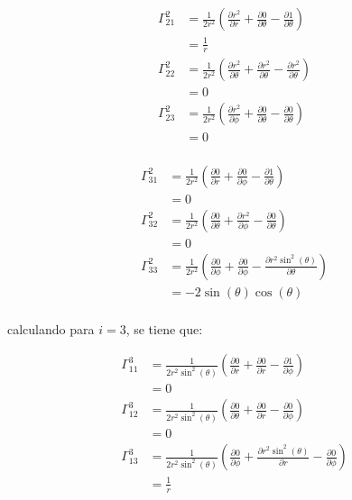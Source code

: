 \documentclass[12pt,letterpaper]{report}
\begin{document}
\hspace{0.25cm}
\begin{minipage}{0.3\linewidth}
    \begin{align*}
        \Gamma^{2}_{21} &= \frac{1}{2r^2} \left(\frac{\partial r^2}{\partial r}+ \frac{\partial 0}{\partial \theta} - \frac{\partial 1}{\partial \theta}\right)\\
&=\frac{1}{r}\\
\Gamma^{2}_{22} &= \frac{1}{2r^2} \left(\frac{\partial r^2}{\partial \theta}+\frac{\partial r^2}{\partial \theta}-\frac{\partial r^2}{\partial \theta} \right)\\
&=0\\
\Gamma^{2}_{23} &= \frac{1}{2r^2} \left(\frac{\partial r^2}{\partial \phi}+\frac{\partial 0}{\partial \theta}-\frac{\partial 0}{\partial \theta} \right)\\
&=0\\
    \end{align*}
\end{minipage}
\hspace{0.25cm}
\begin{minipage}{0.3\linewidth}
    \begin{align*}
        \Gamma^{2}_{31} &= \frac{1}{2r^2} \left(\frac{\partial 0}{\partial r}+ \frac{\partial 0}{\partial \phi} - \frac{\partial 1}{\partial \theta}\right)\\
        &=0\\
        \Gamma^{2}_{32} &= \frac{1}{2r^2} \left(\frac{\partial 0}{\partial \theta}+\frac{\partial r^2}{\partial \phi}-\frac{\partial 0}{\partial \theta} \right)\\
        &=0\\
        \Gamma^{2}_{33} &= \frac{1}{2r^2} \left(\frac{\partial 0}{\partial \phi}+\frac{\partial 0}{\partial \phi}-\frac{\partial r^2\sin^2(\theta)}{\partial \theta} \right)\\
        &=-2\sin(\theta)\cos(\theta)\\  
    \end{align*}
\end{minipage}
calculando para $i=3$, se tiene que:\\
\begin{minipage}{0.3\linewidth}
    \begin{align*}
        \Gamma^{3}_{11} &= \frac{1}{2r^2\sin^2(\theta)} \left(\frac{\partial 0}{\partial r}+ \frac{\partial 0}{\partial r} - \frac{\partial 1}{\partial \phi}\right)\\
        &=0\\
        \Gamma^{3}_{12} &= \frac{1}{2r^2\sin^2(\theta)} \left(\frac{\partial 0}{\partial \theta}+\frac{\partial 0}{\partial r}-\frac{\partial 0}{\partial \phi} \right)\\
        &=0\\
        \Gamma^{3}_{13} &= \frac{1}{2r^2\sin^2(\theta)} \left(\frac{\partial 0}{\partial \phi}+\frac{\partial r^2\sin^2(\theta)}{\partial r}-\frac{\partial 0}{\partial \phi} \right)\\
        &=\frac{1}{r}\\
    \end{align*}
\end{minipage}
\end{document}
